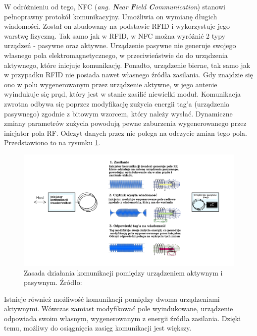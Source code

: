 W odróżnieniu od tego, NFC (\textit{ang. \textbf{N}ear \textbf{F}ield \textbf{C}ommunication}) stanowi pełnoprawny protokół komunikacyjny. Umożliwia on wymianę długich wiadomości. Został on zbudowany na podstawie RFID i wykorzystuje jego warstwę fizyczną. Tak samo jak w RFID, w NFC można wyróżnić 2 typy urządzeń - pasywne oraz aktywne. Urządzenie pasywne nie generuje swojego własnego pola elektromagnetycznego, w przeciwieństwie do do urządzenia aktywnego, które inicjuje komunikację. Ponadto, urządzenie bierne, tak samo jak w przypadku RFID nie posiada nawet własnego źródła zasilania. Gdy znajdzie się ono w polu wygenerowanym przez urządzenie aktywne, w jego antenie wyindukuje się prąd, który jest w stanie zasilić niewielki moduł. Komunikacja zwrotna odbywa się poprzez modyfikację zużycia energii tag'a (urządzenia pasywnego) zgodnie z bitowym wzorcem, który należy wysłać. Dynamiczne zmiany parametrów zużycia powodują pewne zaburzenia wygenerowanego przez inicjator pola RF. Odczyt danych przez nie polega na odczycie zmian tego pola. Przedstawiono to na rysunku \ref{fig:image_nfc_comm}. 

\begin{figure}[H]
	\centering
	\includegraphics[width=18cm]{img/theory/NFC/NFC_communication.png}
	\caption{Zasada działania komunikacji pomiędzy urządzeniem aktywnym i pasywnym. Źródło: \cite{NFC_NXP}}
	\label{fig:image_nfc_comm}
\end{figure}

Istnieje również możliwość komunikacji pomiędzy dwoma urządzeniami aktywnymi. Wówczas zamiast modyfikować pole wyindukowane, urządzenie odpowiada swoim własnym, wygenerowanym z energii źródła zasilania. Dzięki temu, możliwy do osiągnięcia zasięg komunikacji jest większy. 

